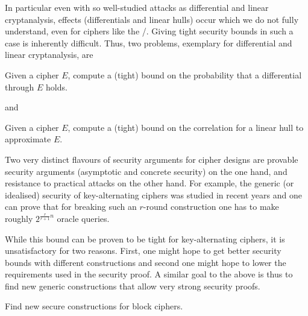 In particular even with so well-studied attacks as differential and linear cryptanalysis, effects (differentials and linear hulls) occur which we do not fully understand, even for ciphers like the \AES/.
Giving tight security bounds in such a case is inherently difficult.
Thus, two problems, exemplary for differential and linear cryptanalysis, are
\begin{problem}[Differentials]\label{prob:differentials}
    Given a cipher $E$, compute a (tight) bound on the probability that a differential through $E$ holds.
\end{problem}
and
\begin{problem}\label{prob:linear_hulls}
    Given a cipher $E$, compute a (tight) bound on the correlation for a linear hull to approximate $E$.
\end{problem}

Two very distinct flavours of security arguments for cipher designs are provable security arguments (asymptotic and concrete security) on the one hand, and resistance to practical attacks on the other hand.
For example, the generic (or idealised) security of key-alternating ciphers was studied in recent years and one can prove that for breaking such an $r$-round construction one has to make roughly $2^{\frac{r}{r+1}n}$ oracle queries.

While this bound can be proven to be tight for key-alternating ciphers, it is unsatisfactory for two reasons.
First, one might hope to get better security bounds with different constructions and second one might hope to lower the requirements used in the security proof.
A similar goal to the above is thus to find new generic constructions that allow very strong security proofs.

\begin{problem}\label{prob:cipher_constructions}
    Find new secure constructions for block ciphers.
\end{problem}

